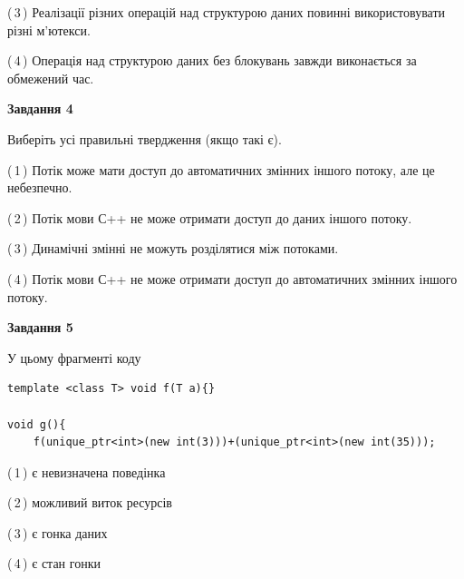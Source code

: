 \documentclass[12pt, ukrainian]{article}
\begin{document}
\begin {large}
{(\,3\,) Реалізації різних операцій над структурою даних повинні використовувати різні м’ютекси.%

(\,4\,) Операція над структурою даних без блокувань завжди виконається за обмежений час.%



\begin{center}
\textbf{Завдання 4}
\end{center}
Виберіть усі правильні твердження (якщо такі є).\par
\vspace{2mm}

(\,1\,) Потік може мати доступ до автоматичних змінних іншого потоку, але це небезпечно.%

(\,2\,) Потік мови С++ не може отримати доступ до даних іншого потоку.%

(\,3\,) Динамічні змінні не можуть розділятися між потоками.%

(\,4\,) Потік мови С++ не може отримати доступ до автоматичних змінних іншого потоку.%



\begin{center}
\textbf{Завдання 5}
\end{center}
У цьому фрагменті коду
\begin{verbatim}
template <class T> void f(T a){}

void g(){
    f(unique_ptr<int>(new int(3)))+(unique_ptr<int>(new int(35)));
\end{verbatim}

(\,1\,) є невизначена поведінка%

(\,2\,) можливий виток ресурсів%

(\,3\,) є гонка даних%

(\,4\,) є стан гонки%


}
\end {large}
\end{document}

